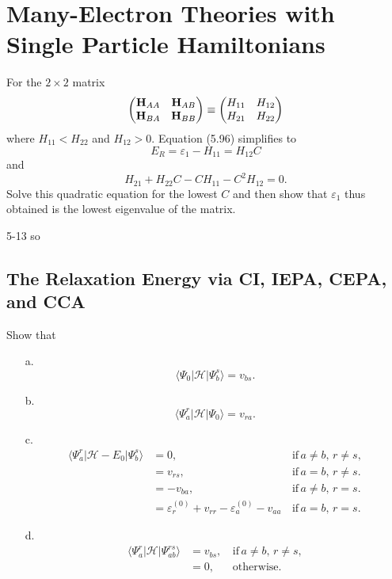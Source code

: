 \documentclass[a4paper]{book}
\newcommand{\HH}{{\bf H}}
\begin{document}
	\section{Many-Electron Theories with Single Particle Hamiltonians}
	
	\begin{exercise}
	For the $2 \times 2$ matrix
	\[
		\begin{pmatrix}
			\HH_{AA} & \HH_{AB} \\ \HH_{BA} & \HH_{BB} 
		\end{pmatrix} \equiv \begin{pmatrix}
		H_{11} & H_{12} \\ H_{21} & H_{22}
		\end{pmatrix}
	\]
	where $H_{11} < H_{22}$ and $H_{12} > 0$. Equation (5.96) simplifies to
	\[
		E_R = \varepsilon_1 - H_{11} = H_{12} C
	\]
	and
	\[
		H_{21} + H_{22} C - C H_{11} - C^2 H_{12} = 0.
	\]
	Solve this quadratic equation for the lowest $C$ and then show that $\varepsilon_1$ thus obtained is the lowest eigenvalue of the matrix.
	\end{exercise}
	
	\begin{solution}
		5-13 so
	\end{solution}
	
	\subsection{The Relaxation Energy via CI, IEPA, CEPA, and CCA}
	
	\begin{exercise}
	Show that
	\begin{enumerate}
	
	\item[a.]
	\[
		\langle \Psi_0 | \mathscr{H} | \Psi^s_b \rangle = v_{bs}.
	\]
	
	\item[b.] 
	\[
		\langle \Psi^r_a | \mathscr{H} | \Psi_0 \rangle = v_{ra}.
	\]
	
	\item[c.]
	\begin{align*}
	\langle \Psi^r_a | \mathscr{H} - E_0 | \Psi^s_b \rangle &= 0 , &\,\text{if} \, a\neq b, \, r \neq s, \\
	&= v_{rs} , &\,\text{if} \, a = b , \, r \neq s. \\
	&= -v_{ba} , &\,\text{if} \, a \neq b , \, r = s. \\
	&= \varepsilon^{(0)}_r + v_{rr} - \varepsilon^{(0)}_a - v_{aa} &\, \text{if} \, a = b , \, r = s.
	\end{align*}		
	
	\item[d.] 
	\begin{align*}
	\langle \Psi^r_a | \mathscr{H} | \Psi^{rs}_{ab} \rangle &= v_{bs} , &\,\text{if} \, a \neq b, \, r \neq s, \\
	&=0, &\,\text{otherwise}.
	\end{align*}	
	
	\end{enumerate}
	\end{exercise}
	
\end{document}
